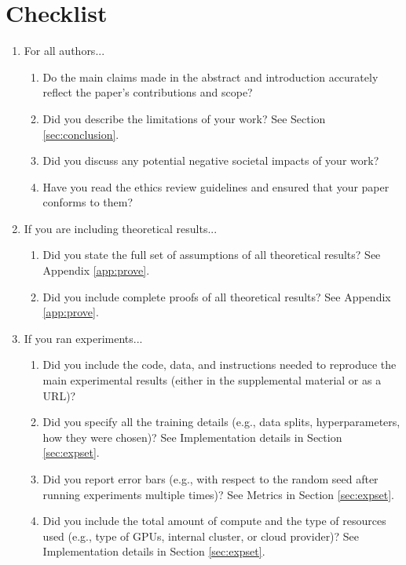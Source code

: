 \section*{Checklist}

\begin{enumerate}


\item For all authors...
\begin{enumerate}
  \item Do the main claims made in the abstract and introduction accurately reflect the paper's contributions and scope?
    \answerYes{}
  \item Did you describe the limitations of your work?
    \answerYes{} See Section \ref{sec:conclusion}.
  \item Did you discuss any potential negative societal impacts of your work?
    \answerNA{}
  \item Have you read the ethics review guidelines and ensured that your paper conforms to them?
    \answerYes{}
\end{enumerate}


\item If you are including theoretical results...
\begin{enumerate}
  \item Did you state the full set of assumptions of all theoretical results?
    \answerYes{} See Appendix \ref{app:prove}.
        \item Did you include complete proofs of all theoretical results?
    \answerYes{} See Appendix \ref{app:prove}.
\end{enumerate}


\item If you ran experiments...
\begin{enumerate}
  \item Did you include the code, data, and instructions needed to reproduce the main experimental results (either in the supplemental material or as a URL)?
    \answerYes{}
  \item Did you specify all the training details (e.g., data splits, hyperparameters, how they were chosen)?
    \answerYes{} See Implementation details in Section \ref{sec:expset}.
        \item Did you report error bars (e.g., with respect to the random seed after running experiments multiple times)?
    \answerYes{} See Metrics in Section \ref{sec:expset}.
        \item Did you include the total amount of compute and the type of resources used (e.g., type of GPUs, internal cluster, or cloud provider)?
    \answerYes{} See Implementation details in Section \ref{sec:expset}.
\end{enumerate}



\end{enumerate}
